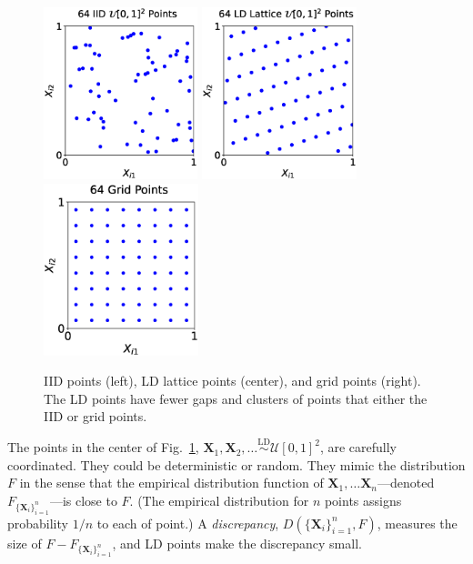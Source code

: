 \documentclass[11pt]{NSFamsart}
\newcommand{\bX}{{\boldsymbol{X}}}
\newcommand{\calu}{{\mathcal{U}}}
\newcommand{\LDSim}{\overset{\text{LD}}{\sim}}
\begin{document}
\begin{figure}[H]
	\centering
	\includegraphics[height = 5cm]{ProgramsImages/iid_scatter.eps} \quad
	\includegraphics[height = 5cm]{ProgramsImages/lattice_scatter.eps} \quad
	\includegraphics[height = 5cm]{ProgramsImages/grid_scatter.eps}
	\caption{IID points (left), LD lattice points (center), and grid points (right).  The LD points have fewer gaps and clusters of points that either the IID or grid points. \label{fig:iid_vs_ld}}
\end{figure}

The  points in the center of Fig.\ \ref{fig:iid_vs_ld}, $\bX_1, \bX_2,  \ldots \LDSim \calu[0,1]^2$, are carefully coordinated.  They could be deterministic or random.  They mimic the distribution $F$  in the sense that the empirical distribution function of  $\bX_1, \ldots \bX_n$---denoted $F_{\{\bX_i\}_{i=1}^n}$---is close to $F$.  (The empirical distribution for $n$  points assigns probability $1/n$ to each of point.)  A \emph{discrepancy}, $D(\{\bX_i\}_{i=1}^n, F)$, measures the size of $F - F_{\{\bX_i\}_{i=1}^n}$, and LD points make the discrepancy small.
\end{document}
